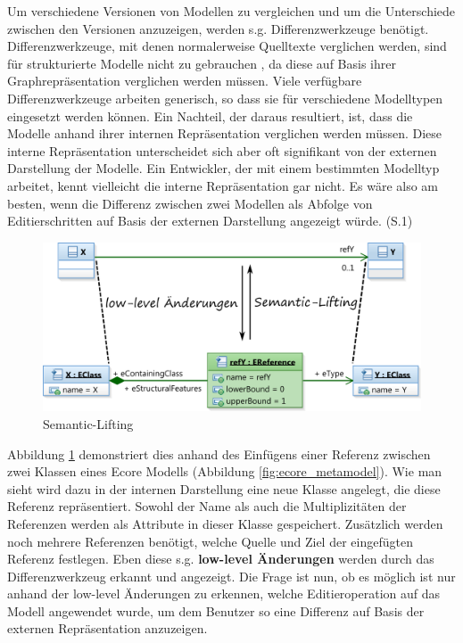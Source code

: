 Um verschiedene Versionen von Modellen zu vergleichen und um die Unterschiede zwischen den Versionen
anzuzeigen, werden s.g. Differenzwerkzeuge benötigt. Differenzwerkzeuge, mit denen normalerweise
Quelltexte verglichen werden, sind für strukturierte Modelle nicht zu gebrauchen \cite{LE09}, da
diese auf Basis ihrer Graphrepräsentation verglichen werden müssen. Viele verfügbare
Differenzwerkzeuge arbeiten generisch, so dass sie für verschiedene Modelltypen eingesetzt werden
können. Ein Nachteil, der daraus resultiert, ist, dass die Modelle anhand ihrer internen
Repräsentation verglichen werden müssen. Diese interne Repräsentation unterscheidet sich aber oft
signifikant von der externen Darstellung der Modelle. Ein Entwickler, der mit einem bestimmten
Modelltyp arbeitet, kennt vielleicht die interne Repräsentation gar nicht. Es wäre also am besten,
wenn die Differenz zwischen zwei Modellen als Abfolge von Editierschritten auf Basis der externen
Darstellung angezeigt würde. \cite{KeKT2011ASE} (S.1)

\begin{figure}[htb]
  \centering
  \includegraphics[width=1.0\textwidth]{images/semantic_lifting.png}
  \caption{Semantic-Lifting}
  \label{fig:semantic_lifting}
\end{figure}

Abbildung \ref{fig:semantic_lifting} demonstriert dies anhand des Einfügens einer Referenz zwischen
zwei Klassen eines Ecore Modells (Abbildung \ref{fig:ecore_metamodel}). Wie man sieht wird dazu in
der internen Darstellung eine neue Klasse angelegt, die diese Referenz repräsentiert. Sowohl der
Name als auch die Multiplizitäten der Referenzen werden als Attribute in dieser Klasse gespeichert.
Zusätzlich werden noch mehrere Referenzen benötigt, welche Quelle und Ziel der eingefügten Referenz
festlegen. Eben diese s.g. \textbf{low-level Änderungen} werden durch das Differenzwerkzeug erkannt
und angezeigt. Die Frage ist nun, ob es möglich ist nur anhand der low-level Änderungen zu erkennen,
welche Editieroperation auf das Modell angewendet wurde, um dem Benutzer so eine Differenz auf Basis
der externen Repräsentation anzuzeigen.

